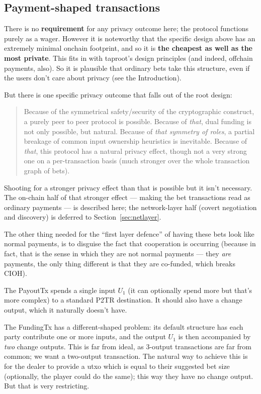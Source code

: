 \documentclass[11pt]{article}
\begin{document}
\subsection{Payment-shaped transactions}
\label{sec:pst}

There is no \textbf{requirement} for any privacy outcome here; the protocol functions purely as a wager. However it is noteworthy that the specific design above has an extremely minimal onchain footprint, and so it is \textbf{the cheapest as well as the most private}. This fits in with taproot's design principles (and indeed, offchain payments, also). So it is plausible that ordinary bets take this structure, even if the users don't care about privacy (see the Introduction).

But there is one specific privacy outcome that falls out of the root design:

\begin{quotation}
Because of the symmetrical safety/security of the cryptographic construct, a purely peer to peer protocol is possible. Because of \emph{that}, dual funding is not only possible, but natural. Because of \emph{that symmetry of roles}, a partial breakage of common input ownership heuristics \cite{fistful} is inevitable. Because of \emph{that}, this protocol has a natural privacy effect, though not a very strong one on a per-transaction basis (much stronger over the whole transaction graph of bets).
\end{quotation}

Shooting for a stronger privacy effect than that is possible but it isn't necessary. The on-chain half of that stronger effect --- making the bet transactions read as ordinary payments --- is described here; the network-layer half (covert negotiation and discovery) is deferred to Section~\ref{sec:netlayer}.

The other thing needed for the ``first layer defence'' of having these bets look like normal payments, is to disguise the fact that cooperation is occurring (because in fact, that is the sense in which they are not normal payments --- they \emph{are} payments, the only thing different is that they are co-funded, which breaks CIOH).

The PayoutTx spends a single input $U_1$ (it can optionally spend more but that's more complex) to a standard P2TR destination. It should also have a change output, which it naturally doesn't have.

The FundingTx has a different-shaped problem: its default structure has each party contribute one or more inputs, and the output $U_1$ is then accompanied by \emph{two} change outputs. This is far from ideal, as 3-output transactions are far from common; we want a two-output transaction. The natural way to achieve this is for the dealer to provide a utxo which is equal to their suggested bet size (optionally, the player could do the same); this way they have no change output. But that is very restricting.
\end{document}
